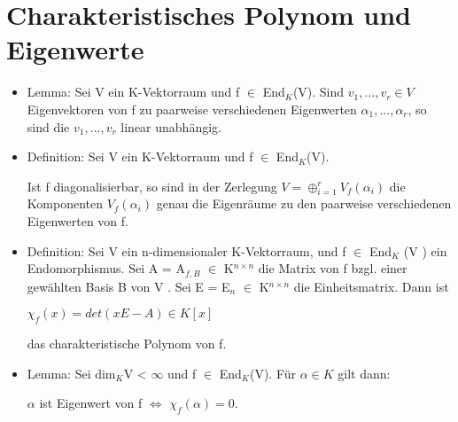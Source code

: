 \section{Charakteristisches Polynom und Eigenwerte}
\begin{itemize}
\item Lemma: Sei V ein K-Vektorraum und f $\in$ End$_K$(V). Sind $v_1, …, v_r \in V$ Eigenvektoren von f zu paarweise verschiedenen Eigenwerten $\alpha_1, ..., \alpha_r$, so sind die $v_1, ..., v_r$ linear unabhängig.
\item Definition: Sei V ein K-Vektorraum und f $\in$ End$_K$(V).
Ist f diagonalisierbar, so sind in der Zerlegung $V = \oplus_{i=1}^{r} V_f (\alpha_i)$ die Komponenten $V_f (\alpha_i)$ genau die Eigenräume zu den paarweise verschiedenen Eigenwerten von f.
\item Definition: Sei V ein n-dimensionaler K-Vektorraum, und f $\in$ End$_K$ (V ) ein Endomorphismus. Sei A = A$_{f,B}$ $\in$ K$^{n \times n}$ die Matrix von f bzgl. einer gewählten Basis B von V . Sei E = E$_n$ $\in$ K$^{n \times n}$ die Einheitsmatrix. Dann ist
\begin{center}
$\chi_f (x) = det(xE - A) \in K[x]$
\end{center}
das charakteristische Polynom von f.
\item Lemma: Sei dim$_K$V < $\infty$ und f $\in$ End$_K$(V). Für $\alpha \in K$ gilt dann:
\begin{center}
$\alpha$ ist Eigenwert von f $\Leftrightarrow$ $\chi_f(\alpha) = 0$.
\end{center}
\end{itemize}


